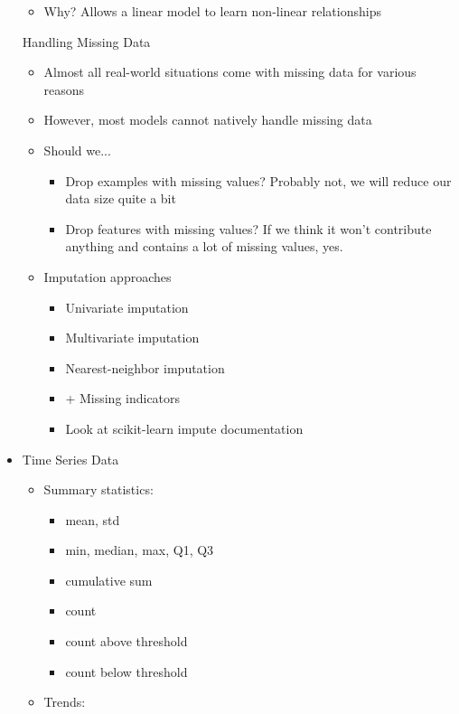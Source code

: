 \documentclass[10pt, oneside]{article}
\begin{document}
\begin{itemize}
\begin{itemize}
        \item Why? Allows a linear model to learn non-linear relationships
    \end{itemize}
    \itme Handling Missing Data
    \begin{itemize}
        \item Almost all real-world situations come with missing data for various reasons
        \item However, most models cannot natively handle missing data
        \item Should we...
        \begin{itemize}
            \item Drop examples with missing values? Probably not, we will reduce our data size quite a bit
            \item Drop features with missing values? If we think it won't contribute anything and contains a lot of missing values, yes.
        \end{itemize}
        \item Imputation approaches
        \begin{itemize}
            \item Univariate imputation
            \item Multivariate imputation
            \item Nearest-neighbor imputation
            \item + Missing indicators
            \item Look at scikit-learn impute documentation
        \end{itemize}
    \end{itemize}
    \item Time Series Data
    \begin{itemize}
        \item Summary statistics:
        \begin{itemize}
            \item mean, std
            \item min, median, max, Q1, Q3
            \item cumulative sum
            \item count
            \item count above threshold
            \item count below threshold
        \end{itemize}
        \item Trends:
        \begin{itemize}

\end{itemize}
\end{itemize}
\end{itemize}
\end{document}
